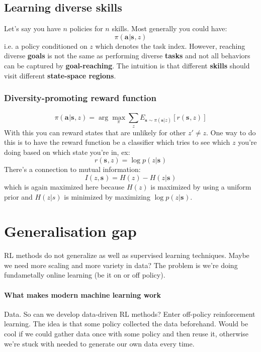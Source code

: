 \documentclass{report}
\newcommand{\argmax}{\arg\!\max}
\begin{document}
\subsection{Learning diverse skills}
Let's say you have $n$ policies for $n$ skills.
Most generally you could have:
\begin{equation}
		\pi(\bm{a}_{}|\bm{s}_{},z)
\end{equation}
i.e. a policy conditioned on $z$ which denotes the task index.
However, reaching diverse \textbf{goals} is not the same as performing diverse \textbf{tasks}
and not all behaviors can be captured by \textbf{goal-reaching}.
The intuition is that different \textbf{skills} should visit different \textbf{state-space regions}.

\subsubsection{Diversity-promoting reward function}
\begin{equation}
		\pi(\bm{a}_{}|\bm{s}_{},z) = \argmax_\pi \sum_{z}^{} E_{\bm{s}_{} \sim \pi(\bm{s}_{}|z)} \left[ r(\bm{s}_{},z) \right] 
\end{equation}
With this you can reward states that are unlikely for other $ z' \neq z  $.
One way to do this is to have the reward function be a classifier which tries to see which $z$ you're doing
based on which state you're in, ex:
\begin{equation}
		r(\bm{s}_{}, z) = \log p(z|\bm{s}_{})
\end{equation}
There's a connection to mutual information:
\begin{equation}
		I(z, \bm{s}_{}) = H(z) - H(z|\bm{s}_{})
\end{equation}
which is again maximized here
because $H(z)$ is maximized by using a uniform prior and 
$H(z|s)$ is minimized by maximizing $\log p(z|\bm{s}_{})$.

\section{Generalisation gap}
RL methods do not generalize as well as supervised learning techniques.
Maybe we need more scaling and more variety in data?
The problem is we're doing fundametally online learning (be it on or off policy).
\paragraph{What makes modern machine learning work}
Data.
So can we develop data-driven RL methods?
Enter off-policy reinforcement learning.
The idea is that some policy collected the data beforehand.
Would be cool if we could gather data once with some policy and then reuse it, otherwise we're stuck
with needed to generate our own data every time.
\end{document}
